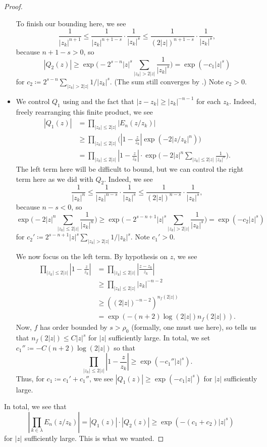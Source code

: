 \documentclass[notes.tex]{subfiles}
\begin{document}
\begin{proof}
\begin{itemize}
		To finish our bounding here, we see
		\[\frac1{|z_k|^{n+1}}\le\frac1{|z_k|^{n+1-s}}\cdot\frac1{|z_k|^{s}}\le\frac1{(2|z|)^{n+1-s}}\cdot\frac1{|z_k|^{s}},\]
		because $n+1-s>0$, so
		\[|Q_2(z)|\ge\exp\Bigg(-2^{s-n}|z|^s\sum_{|z_k|>2|z|}\frac1{|z_k|^s}\Bigg)=\exp\left(-c_1|z|^s\right)\]
		for $c_2\coloneqq2^{s-n}\sum_{|z_k|>2|z|}1/|z_k|^s$. (The sum still converges by .) Note $c_2>0$.

		\item We control $Q_1$ using  and the fact that $|z-z_k|\ge|z_k|^{-n-1}$ for each $z_k$. Indeed, freely rearranging this finite product, we see
		\begin{align*}
			|Q_1(z)| &= \prod_{|z_k|\le2|z|}|E_n(z/z_k)| \\
			&\ge \prod_{|z_k|\le2|z|}\Bigg(\left|1-\frac z{z_k}\right|\exp\left(-2|z/z_k|^n\right)\Bigg) \\
			&= \prod_{|z_k|\le2|z|}\left|1-\frac z{z_k}\right|\cdot\exp\Bigg(-2|z|^n\sum_{|z_k|\le2|z|}\frac1{|z_k|^n}\Bigg).
		\end{align*}
		The left term here will be difficult to bound, but we can control the right term here as we did with $Q_2$. Indeed, we see
		\[\frac1{|z_k|^n}\le\frac1{|z_k|^{n-s}}\cdot\frac1{|z_k|^{s}}\le\frac1{(2|z|)^{n-s}}\cdot\frac1{|z_k|^{s}},\]
		because $n-s<0$, so
		\[\exp\Bigg(-2|z|^n\sum_{|z_k|\le2|z|}\frac1{|z_k|^n}\Bigg)\ge\exp\Bigg(-2^{s-n+1}|z|^s\sum_{|z_k|>2|z|}\frac1{|z_k|^s}\Bigg)=\exp\left(-c_2|z|^s\right)\]
		for $c_2'\coloneqq2^{s-n+1}|z|^s\sum_{|z_k|>2|z|}1/|z_k|^s$. Note $c_1'>0$.

		We now focus on the left term. By hypothesis on $z$, we see
		\begin{align*}
			\prod_{|z_k|\le2|z|}\left|1-\frac z{z_k}\right| &= \prod_{|z_k|\le2|z|}\left|\frac{z-z_k}{z_k}\right| \\
			&\ge \prod_{|z_k|\le2|z|}|z_k|^{-n-2} \\
			&\ge \left((2|z|)^{-n-2}\right)^{n_f(2|z|)} \\
			&= \exp\left(-(n+2)\log(2|z|)n_f(2|z|)\right).
		\end{align*}
		Now, $f$ has order bounded by $s>\rho_0$ (formally, one must use  here), so  tells us that $n_f(2|z|)\le C|z|^s$ for $|z|$ sufficiently large. In total, we set $c_1''\coloneqq-C(n+2)\log(2|z|)$ so that
		\[\prod_{|z_k|\le2|z|}\left|1-\frac z{z_k}\right|\ge\exp\left(-c_1''|z|^s\right).\]
		Thus, for $c_1\coloneqq c_1'+c_1''$, we see $|Q_1(z)|\ge\exp\left(-c_1|z|^s\right)$ for $|z|$ sufficiently large.
	\end{itemize}
	In total, we see that
	\[\left|\prod_{k\in\lambda} E_n(z/z_k)\right|=|Q_1(z)|\cdot|Q_2(z)|\ge\exp\left(-(c_1+c_2)|z|^s\right)\]
	for $|z|$ sufficiently large. This is what we wanted.
\end{proof}
\end{document}

